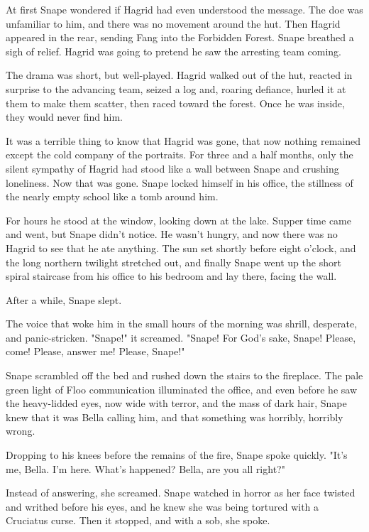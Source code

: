 At first Snape wondered if Hagrid had even understood the message. The doe was unfamiliar to him, and there was no movement around the hut. Then Hagrid appeared in the rear, sending Fang into the Forbidden Forest. Snape breathed a sigh of relief. Hagrid was going to pretend he saw the arresting team coming.

The drama was short, but well-played. Hagrid walked out of the hut, reacted in surprise to the advancing team, seized a log and, roaring defiance, hurled it at them to make them scatter, then raced toward the forest. Once he was inside, they would never find him.

It was a terrible thing to know that Hagrid was gone, that now nothing remained except the cold company of the portraits. For three and a half months, only the silent sympathy of Hagrid had stood like a wall between Snape and crushing loneliness. Now that was gone. Snape locked himself in his office, the stillness of the nearly empty school like a tomb around him.

For hours he stood at the window, looking down at the lake. Supper time came and went, but Snape didn't notice. He wasn't hungry, and now there was no Hagrid to see that he ate anything. The sun set shortly before eight o'clock, and the long northern twilight stretched out, and finally Snape went up the short spiral staircase from his office to his bedroom and lay there, facing the wall.

After a while, Snape slept.

The voice that woke him in the small hours of the morning was shrill, desperate, and panic-stricken. "Snape!" it screamed. "Snape! For God's sake, Snape! Please, come! Please, answer me! Please, Snape!"

Snape scrambled off the bed and rushed down the stairs to the fireplace. The pale green light of Floo communication illuminated the office, and even before he saw the heavy-lidded eyes, now wide with terror, and the mass of dark hair, Snape knew that it was Bella calling him, and that something was horribly, horribly wrong.

Dropping to his knees before the remains of the fire, Snape spoke quickly. "It's me, Bella. I'm here. What's happened? Bella, are you all right?"

Instead of answering, she screamed. Snape watched in horror as her face twisted and writhed before his eyes, and he knew she was being tortured with a Cruciatus curse. Then it stopped, and with a sob, she spoke.

